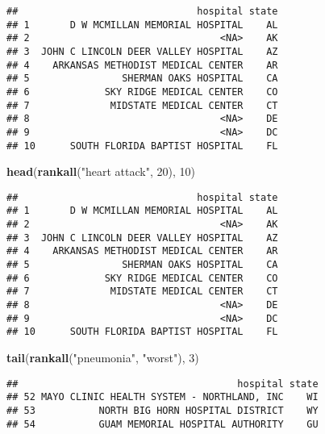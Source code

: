 \documentclass[
]{article}
\newenvironment{Shaded}{\begin{snugshade}}{\end{snugshade}}
\newcommand{\DecValTok}[1]{\textcolor[rgb]{0.00,0.00,0.81}{#1}}
\newcommand{\FunctionTok}[1]{\textcolor[rgb]{0.13,0.29,0.53}{\textbf{#1}}}
\newcommand{\NormalTok}[1]{#1}
\newcommand{\StringTok}[1]{\textcolor[rgb]{0.31,0.60,0.02}{#1}}
\begin{document}
\begin{verbatim}
##                               hospital state
## 1       D W MCMILLAN MEMORIAL HOSPITAL    AL
## 2                                 <NA>    AK
## 3  JOHN C LINCOLN DEER VALLEY HOSPITAL    AZ
## 4    ARKANSAS METHODIST MEDICAL CENTER    AR
## 5                SHERMAN OAKS HOSPITAL    CA
## 6             SKY RIDGE MEDICAL CENTER    CO
## 7              MIDSTATE MEDICAL CENTER    CT
## 8                                 <NA>    DE
## 9                                 <NA>    DC
## 10      SOUTH FLORIDA BAPTIST HOSPITAL    FL
\end{verbatim}

\begin{Shaded}
\begin{Highlighting}[]
\FunctionTok{head}\NormalTok{(}\FunctionTok{rankall}\NormalTok{(}\StringTok{"heart attack"}\NormalTok{, }\DecValTok{20}\NormalTok{), }\DecValTok{10}\NormalTok{)}
\end{Highlighting}
\end{Shaded}

\begin{verbatim}
##                               hospital state
## 1       D W MCMILLAN MEMORIAL HOSPITAL    AL
## 2                                 <NA>    AK
## 3  JOHN C LINCOLN DEER VALLEY HOSPITAL    AZ
## 4    ARKANSAS METHODIST MEDICAL CENTER    AR
## 5                SHERMAN OAKS HOSPITAL    CA
## 6             SKY RIDGE MEDICAL CENTER    CO
## 7              MIDSTATE MEDICAL CENTER    CT
## 8                                 <NA>    DE
## 9                                 <NA>    DC
## 10      SOUTH FLORIDA BAPTIST HOSPITAL    FL
\end{verbatim}

\begin{Shaded}
\begin{Highlighting}[]
\FunctionTok{tail}\NormalTok{(}\FunctionTok{rankall}\NormalTok{(}\StringTok{"pneumonia"}\NormalTok{, }\StringTok{"worst"}\NormalTok{), }\DecValTok{3}\NormalTok{)}
\end{Highlighting}
\end{Shaded}

\begin{verbatim}
##                                      hospital state
## 52 MAYO CLINIC HEALTH SYSTEM - NORTHLAND, INC    WI
## 53           NORTH BIG HORN HOSPITAL DISTRICT    WY
## 54           GUAM MEMORIAL HOSPITAL AUTHORITY    GU
\end{verbatim}
\end{document}
